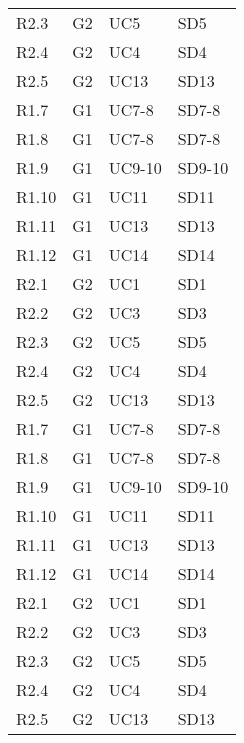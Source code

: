 \begin{longtable}{|p{}|p{}|p{}|p{}|}
    R2.3 & G2 & UC5    & SD5  \\
    R2.4 & G2 & UC4    & SD4  \\
    R2.5 & G2 & UC13   & SD13 \\
    R1.7 & G1 & UC7-8  & SD7-8 \\
    R1.8 & G1 & UC7-8  & SD7-8 \\
    R1.9 & G1 & UC9-10 & SD9-10 \\
    R1.10 & G1 & UC11  & SD11 \\
    R1.11 & G1 & UC13  & SD13 \\
    R1.12 & G1 & UC14  & SD14 \\
    R2.1 & G2 & UC1    & SD1  \\
    R2.2 & G2 & UC3    & SD3  \\
    R2.3 & G2 & UC5    & SD5  \\
    R2.4 & G2 & UC4    & SD4  \\
    R2.5 & G2 & UC13   & SD13 \\
    R1.7 & G1 & UC7-8  & SD7-8 \\
    R1.8 & G1 & UC7-8  & SD7-8 \\
    R1.9 & G1 & UC9-10 & SD9-10 \\
    R1.10 & G1 & UC11  & SD11 \\
    R1.11 & G1 & UC13  & SD13 \\
    R1.12 & G1 & UC14  & SD14 \\
    R2.1 & G2 & UC1    & SD1  \\
    R2.2 & G2 & UC3    & SD3  \\
    R2.3 & G2 & UC5    & SD5  \\
    R2.4 & G2 & UC4    & SD4  \\
    R2.5 & G2 & UC13   & SD13 \\
    
    \end{longtable}
        


